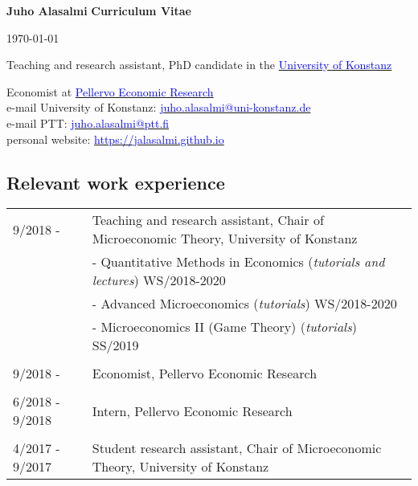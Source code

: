 \documentclass[16pt]{article}
\begin{document}
\noindent \textbf{Juho Alasalmi} \hfill{\textbf{Curriculum Vitae}} \par
\noindent  \hfill{\today} \par
\noindent Teaching and research assistant, PhD candidate in the \href{https://www.wiwi.uni-konstanz.de/goldluecke/team/academic-staff/doctoral-students/}{\textcolor{blue}{University of Konstanz}} \par
\noindent Economist at \href{http://www.ptt.fi/}{\textcolor{blue}{Pellervo Economic Research}} \\

\noindent e-mail University of Konstanz: \href{mailto: juho.alasalmi@uni-konstanz.de}{\textcolor{blue}{juho.alasalmi@uni-konstanz.de}} \\
\noindent e-mail PTT: \href{mailto: juho.alasalmi@ptt.fi}{\textcolor{blue}{juho.alasalmi@ptt.fi}}\\
\noindent personal website: \href{https://jalasalmi.github.io}{\textcolor{blue}{https://jalasalmi.github.io}}

\subsection*{Relevant work experience}
\begin{tabular}{@{}p{1.5in}p{5in}}
9/2018 -            & Teaching and research assistant, Chair of Microeconomic Theory,  University of Konstanz \\
                          &   -  Quantitative Methods in Economics (\textit{tutorials and lectures}) WS/2018-2020  \\
                          &   -  Advanced Microeconomics (\textit{tutorials}) WS/2018-2020 \\   
                          &   -  Microeconomics II (Game Theory) (\textit{tutorials}) SS/2019 \\   
                                                 
\\
9/2018 -            & Economist, Pellervo Economic Research\\

\\
6/2018 - 9/2018 & Intern, Pellervo Economic Research\\

\\
4/2017 - 9/2017 & Student research assistant, Chair of Microeconomic Theory,  University of Konstanz\\
                           
\end{tabular}
\end{document}
